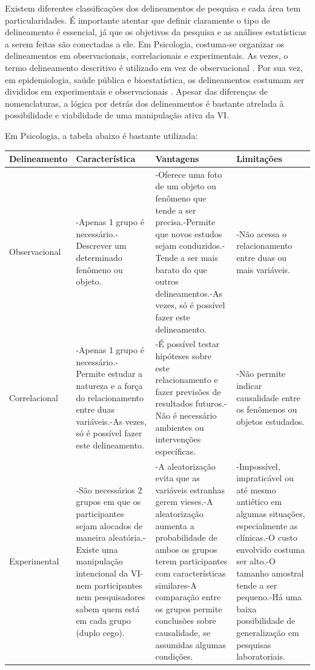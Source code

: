 \documentclass[
]{book}
\begin{document}
Existem diferentes classificações dos delineamentos de pesquisa e cada área tem particularidades. É importante atentar que definir claramente o tipo de delineamento é essencial, já que os objetivos da pesquisa e as análises estatísticas a serem feitas são conectadas a ele. Em Psicologia, costuma-se organizar os delineamentos em observacionais, correlacionais e experimentais. As vezes, o termo delineamento descritivo é utilizado em vez de observacional \citep{stangor2010}. Por sua vez, em epidemiologia, saúde pública e bioestatística, os delineamentos costumam ser divididos em experimentais e observacionais \citep{friis2013, glantz2014}. Apesar das diferenças de nomenclaturas, a lógica por detrás dos delineamentos é bastante atrelada à possibilidade e viabilidade de uma manipulação ativa da VI.

Em Psicologia, a tabela abaixo é bastante utilizada:

\begin{longtable}[]{@{}
  >{\raggedright\arraybackslash}p{}
  >{\raggedright\arraybackslash}p{}
  >{\raggedright\arraybackslash}p{}
  >{\raggedright\arraybackslash}p{}@{}}
\toprule
Delineamento & Característica & Vantagens & Limitações \\
\midrule
\endhead
Observacional & -Apenas 1 grupo é necessário.-Descrever um determinado fenômeno ou objeto. & -Oferece uma foto de um objeto ou fenômeno que tende a ser precisa.-Permite que novos estudos sejam conduzidos.-Tende a ser mais barato do que outros delineamentos.-As vezes, só é possível fazer este delineamento. & -Não acessa o relacionamento entre duas ou mais variáveis. \\
Correlacional & -Apenas 1 grupo é necessário.-Permite estudar a natureza e a força do relacionamento entre duas variáveis.-As vezes, só é possível fazer este delineamento. & -É possível testar hipóteses sobre este relacionamento e fazer previsões de resultados futuros.-Não é necessário ambientes ou intervenções específicas. & -Não permite indicar causalidade entre os fenômenos ou objetos estudados. \\
Experimental & -São necessários 2 grupos em que os participantes sejam alocados de maneira aleatória.-Existe uma manipulação intencional da VI-nem participantes nem pesquisadores sabem quem está em cada grupo (duplo cego). & -A aleatorização evita que as variáveis estranhas gerem vieses.-A aleatorização aumenta a probabilidade de ambos os grupos terem participantes com características similares-A comparação entre os grupos permite conclusões sobre causalidade, se assumidas algumas condições. & -Impossível, impraticável ou até mesmo antiético em algumas situações, especialmente as clínicas.-O custo envolvido costuma ser alto.-O tamanho amostral tende a ser pequeno.-Há uma baixa possibilidade de generalização em pesquisas laboratoriais. \\
\bottomrule
\end{longtable}
\end{document}
